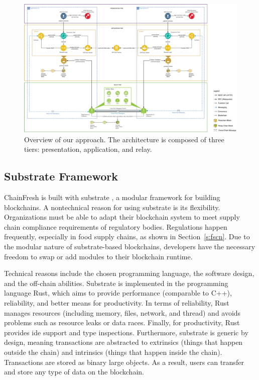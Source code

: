 \documentclass[conference]{IEEEtran}
\begin{document}
\begin{figure}[h]
	\centering
	\includegraphics[width=\linewidth]{tiers_overview}
	\caption{Overview of our approach. The architecture is composed of three tiers: presentation, application, and relay. }
	\label{fig:system_architecture}
\end{figure}

\subsection{Substrate Framework} \label{substrate_framework}
ChainFresh is built with substrate \cite{substrateio}, a modular framework for building blockchains. A nontechnical reason for using substrate is its flexibility. Organizations must be able to adapt their blockchain system to meet supply chain compliance requirements of regulatory bodies. Regulations happen frequently, especially in food supply chains, as shown in Section~\ref{s:fscn}. Due to the modular nature of substrate-based blockchains, developers have the necessary freedom to swap or add modules to their blockchain runtime.

Technical reasons include the chosen programming language, the software design, and the off-chain abilities. Substrate is implemented in the programming language Rust, which aims to provide performance (comparable to C++), reliability, and better means for productivity. In terms of reliability, Rust manages resources (including memory, files, network, and thread) and avoids problems such as resource leaks or data races. Finally, for productivity, Rust provides \ac{ide} support and type inspections. Furthermore, substrate is generic by design, meaning transactions are abstracted to extrinsics (things that happen outside the chain) and intrinsics (things that happen inside the chain). Transactions are stored as binary large objects. As a result, users can transfer and store any type of data on the blockchain. 
\end{document}
